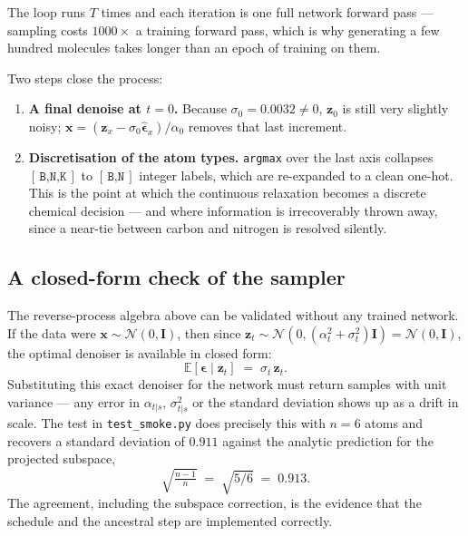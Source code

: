 \documentclass[11pt,a4paper]{article}
\newcommand{\shape}[1]{\ensuremath{[\,\texttt{#1}\,]}}
\newcommand{\code}[1]{\texttt{#1}}
\newcommand{\E}{\mathbb{E}}
\newcommand{\bx}{\mathbf{x}}
\newcommand{\bz}{\mathbf{z}}
\newcommand{\bm}{\boldsymbol{\epsilon}}
\begin{document}
\noindent
The loop runs $T$ times and each iteration is one full network forward pass ---
sampling costs $1000\times$ a training forward pass, which is why generating a
few hundred molecules takes longer than an epoch of training on them.

Two steps close the process:
\begin{enumerate}[leftmargin=1.6em]
\item \textbf{A final denoise at $t=0$.} Because $\sigma_0=0.0032\neq0$, $\bz_0$
      is still very slightly noisy; $\bx = (\bz_x - \sigma_0\hat{\bm}_x)/\alpha_0$
      removes that last increment.
\item \textbf{Discretisation of the atom types.} \code{argmax} over the last axis
      collapses \shape{B,N,K} to \shape{B,N} integer labels, which are re-expanded
      to a clean one-hot. This is the point at which the continuous relaxation
      becomes a discrete chemical decision --- and where information is
      irrecoverably thrown away, since a near-tie between carbon and nitrogen is
      resolved silently.
\end{enumerate}

\subsection{A closed-form check of the sampler}
\label{sec:calib}

The reverse-process algebra above can be validated without any trained network.
If the data were $\bx\sim\mathcal{N}(0,\mathbf{I})$, then since
$\bz_t\sim\mathcal{N}(0,(\alpha_t^2+\sigma_t^2)\mathbf{I})=\mathcal{N}(0,\mathbf{I})$,
the optimal denoiser is available in closed form:
\begin{equation}
  \E[\bm \mid \bz_t] \;=\; \sigma_t\,\bz_t .
\end{equation}
Substituting this exact denoiser for the network must return samples with unit
variance --- any error in $\alpha_{t|s}$, $\sigma^2_{t|s}$ or the standard
deviation shows up as a drift in scale. The test in \code{test\_smoke.py} does
precisely this with $n=6$ atoms and recovers a standard deviation of
$\mathbf{0.911}$ against the analytic prediction for the projected subspace,
\begin{equation}
  \sqrt{\tfrac{n-1}{n}} \;=\; \sqrt{5/6} \;=\; 0.913 .
\end{equation}
The agreement, including the subspace correction, is the evidence that the
schedule and the ancestral step are implemented correctly.
\end{document}
